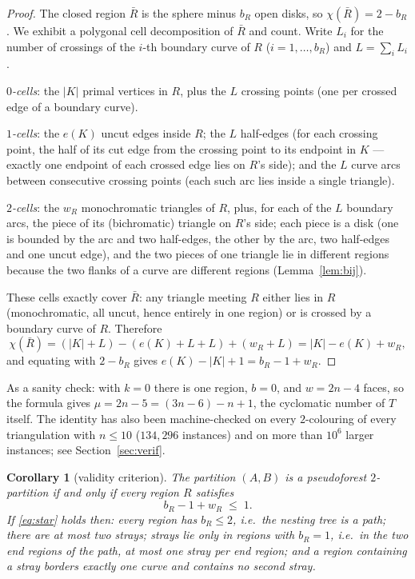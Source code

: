 \documentclass[11pt]{article}
\newtheorem{corollary}[theorem]{Corollary}
\theoremstyle{remark}
\begin{document}
\begin{proof}
The closed region $\bar R$ is the sphere minus $b_R$ open disks, so
$\chi(\bar R)=2-b_R$. We exhibit a polygonal cell decomposition of
$\bar R$ and count. Write $L_i$ for the number of crossings of the $i$-th
boundary curve of $R$ ($i=1,\dots,b_R$) and $L=\sum_i L_i$.

\emph{$0$-cells}: the $|K|$ primal vertices in $R$, plus the $L$ crossing
points (one per crossed edge of a boundary curve).

\emph{$1$-cells}: the $e(K)$ uncut edges inside $R$; the $L$ half-edges
(for each crossing point, the half of its cut edge from the crossing
point to its endpoint in $K$ --- exactly one endpoint of each crossed
edge lies on $R$'s side); and the $L$ curve arcs between consecutive
crossing points (each such arc lies inside a single triangle).

\emph{$2$-cells}: the $w_R$ monochromatic triangles of $R$, plus, for
each of the $L$ boundary arcs, the piece of its (bichromatic) triangle on
$R$'s side; each piece is a disk (one is bounded by the arc and two
half-edges, the other by the arc, two half-edges and one uncut edge), and
the two pieces of one triangle lie in different regions because the two
flanks of a curve are different regions (Lemma~\ref{lem:bij}).

These cells exactly cover $\bar R$: any triangle meeting $R$ either lies
in $R$ (monochromatic, all uncut, hence entirely in one region) or is
crossed by a boundary curve of $R$. Therefore
\[
\chi(\bar R)=(|K|+L)-(e(K)+L+L)+(w_R+L)=|K|-e(K)+w_R,
\]
and equating with $2-b_R$ gives $e(K)-|K|+1=b_R-1+w_R$.
\end{proof}

As a sanity check: with $k=0$ there is one region, $b=0$, and
$w=2n-4$ faces, so the formula gives $\mu=2n-5=(3n-6)-n+1$, the
cyclomatic number of $T$ itself. The identity has also been
machine-checked on every $2$-colouring of every triangulation with
$n\le 10$ ($134{,}296$ instances) and on more than $10^6$ larger
instances; see Section~\ref{sec:verif}.

\begin{corollary}[validity criterion]\label{cor:crit}
The partition $(A,B)$ is a pseudoforest $2$-partition if and only if
every region $R$ satisfies
\begin{equation}
b_R-1+w_R\;\le\;1. \tag{$\star$}\label{eq:star}
\end{equation}
If \eqref{eq:star} holds then: every region has $b_R\le 2$, i.e.\ the
nesting tree is a path; there are at most two strays; strays lie only in
regions with $b_R=1$, i.e.\ in the two end regions of the path, at most
one stray per end region; and a region containing a stray borders exactly
one curve and contains no second stray.
\end{corollary}
\end{document}
